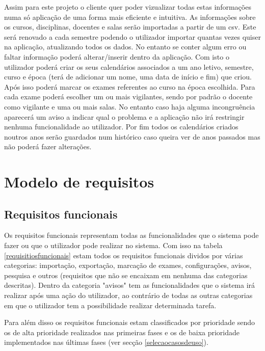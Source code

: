\documentclass[11pt, twoside]{report}
\begin{document}
	
	Assim para este projeto o cliente quer poder vizualizar todas estas informações numa só aplicação de uma forma mais eficiente e intuitiva. As informações sobre os cursos, disciplinas, docentes e salas serão importadas a partir de um csv. Este será renovado a cada semestre podendo o utilizador importar quantas vezes quiser na aplicação, atualizando todos os dados. No entanto se conter algum erro ou faltar informação poderá alterar/inserir dentro da aplicação. Com isto o utilizador poderá criar os seus calendários associados a um ano letivo, semestre, curso e época (terá de adicionar um nome, uma data de início e fim) que criou. Após isso poderá marcar os exames referentes ao curso na época escolhida. Para cada exame poderá escolher um ou mais vigilantes, sendo por padrão o docente como vigilante e uma ou mais salas. No entanto caso haja alguma incongruência aparecerá um aviso a indicar qual o problema e a aplicação não irá restringir nenhuma funcionalidade ao utilizador. Por fim todos os calendários criados noutros anos serão guardados num histórico caso queira ver de anos passados mas não poderá fazer alterações.
	
	\chapter{Modelo de requisitos}
	\label{requisitos}
	\section{Requisitos funcionais}
	
	
	Os requisitos funcionais representam todas as funcionalidades que o sistema pode fazer ou que o utilizador pode realizar no sistema. Com isso na tabela \ref{requisitiosfuncionais} estam todos os requisitos funcionais dividos por várias categorias: importação, exportação, marcação de exames, configurações, avisos, pesquisa e outros (requisitos que não se encaixam em nenhuma das categorias descritas). Dentro da categoria "avisos" tem as funcionalidades que o sistema irá realizar após uma ação do utilizador, ao contrário de todas as outras categorias em que o utilizador tem a possibilidade realizar determinada tarefa.
	
	Para além disso os requisitos funcionais estam classificados por prioridade sendo os de alta prioridade realizados nas primeiras fases e os de baixa prioridade implementados nas últimas fases (ver secção \ref{selecaocasosdeuso}).  
	
	
	
\end{document}

